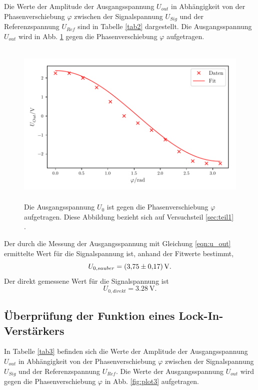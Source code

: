 \noindent Die Werte der Amplitude der Ausgangsspannung $U_{out}$ in Abhängigkeit von der Phasenverschiebung $\varphi$
zwischen der Signalspannung $U_{Sig}$ und der Referenzspannung $U_{Ref}$
sind in Tabelle \ref{tab2} dargestellt. Die Ausgangsspannung $U_{out}$ wird in Abb. \ref{fig:plot2} gegen die Phasenverschiebung $\varphi$
aufgetragen.


\begin{figure}
    \centering
    \includegraphics[width=12cm, height=8cm]{build/plot2.pdf}
    \caption{Die Ausgangsspannung $U_{0}$ ist gegen die Phasenverschiebung $\varphi$ aufgetragen.
    Diese Abbildung bezieht sich auf Versuchsteil \ref{sec:teil1} .}
    \label{fig:plot2}
\end{figure}

\noindent Der durch die Messung der Ausgangsspannung mit Gleichung \eqref{eqn:u_out} ermittelte Wert für die Signalspannung ist, anhand der Fitwerte bestimmt,
\begin{equation*}
    U_{0,sauber} = \SI{3.75 \pm 0.17}{\volt}.
\end{equation*}
Der direkt gemessene Wert für die Signalspannung ist
\begin{equation*}
    U_{0,direkt} = \SI{3.28}{\volt}. %
\end{equation*}

\subsection{Überprüfung der Funktion eines Lock-In-Verstärkers}
\label{sec:teil2}
In Tabelle \ref{tab3} befinden sich die Werte der Amplitude der Ausgangsspannung $U_{out}$ in
Abhängigkeit von der Phasenverschiebung $\varphi$ zwischen der Signalspannung $U_{Sig}$ und
der Referenzspannung $U_{Ref}$. Die Werte der Ausgangsspannung $U_{out}$ wird gegen die Phasenverschiebung $\varphi$
in Abb. \ref{fig:plot3} aufgetragen.


